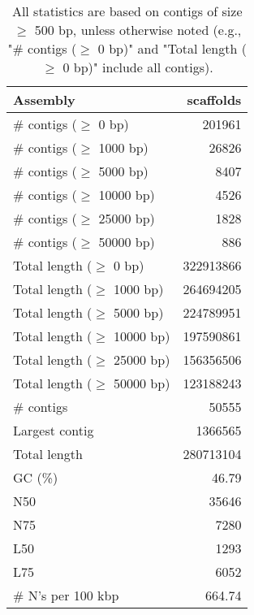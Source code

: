 \documentclass[12pt,a4paper]{article}
\begin{document}
\begin{table}[ht]
\begin{center}
\caption{All statistics are based on contigs of size $\geq$ 500 bp, unless otherwise noted (e.g., "\# contigs ($\geq$ 0 bp)" and "Total length ($\geq$ 0 bp)" include all contigs).}
\begin{tabular}{|l*{1}{|r}|}
\hline
Assembly & scaffolds \\ \hline
\# contigs ($\geq$ 0 bp) & 201961 \\ \hline
\# contigs ($\geq$ 1000 bp) & 26826 \\ \hline
\# contigs ($\geq$ 5000 bp) & 8407 \\ \hline
\# contigs ($\geq$ 10000 bp) & 4526 \\ \hline
\# contigs ($\geq$ 25000 bp) & 1828 \\ \hline
\# contigs ($\geq$ 50000 bp) & 886 \\ \hline
Total length ($\geq$ 0 bp) & 322913866 \\ \hline
Total length ($\geq$ 1000 bp) & 264694205 \\ \hline
Total length ($\geq$ 5000 bp) & 224789951 \\ \hline
Total length ($\geq$ 10000 bp) & 197590861 \\ \hline
Total length ($\geq$ 25000 bp) & 156356506 \\ \hline
Total length ($\geq$ 50000 bp) & 123188243 \\ \hline
\# contigs & 50555 \\ \hline
Largest contig & 1366565 \\ \hline
Total length & 280713104 \\ \hline
GC (\%) & 46.79 \\ \hline
N50 & 35646 \\ \hline
N75 & 7280 \\ \hline
L50 & 1293 \\ \hline
L75 & 6052 \\ \hline
\# N's per 100 kbp & 664.74 \\ \hline
\end{tabular}
\end{center}
\end{table}
\end{document}
